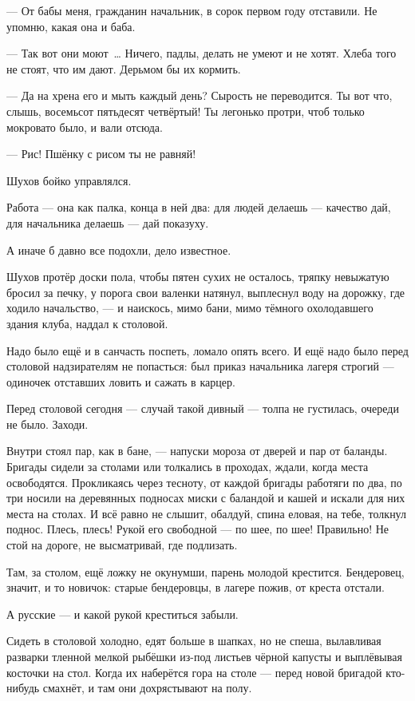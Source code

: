 --- От бабы меня, гражданин начальник, в сорок первом году отставили. Не упомню, какая она и баба.

--- Так вот они моют~\dots{} Ничего, падлы, делать не умеют и не хотят. Хлеба того не стоят, что им дают. Дерьмом бы их кормить.

--- Да на хрена его и мыть каждый день? Сырость не переводится. Ты вот что, слышь, восемьсот пятьдесят четвёртый! Ты легонько протри, чтоб только мокровато было, и вали отсюда.

--- Рис! Пшёнку с рисом ты не равняй!

Шухов бойко управлялся.

Работа --- она как палка, конца в ней два: для людей делаешь --- качество дай, для начальника делаешь --- дай показуху.

А иначе б давно все подохли, дело известное.

Шухов протёр доски пола, чтобы пятен сухих не осталось, тряпку невыжатую бросил за печку, у порога свои валенки натянул, выплеснул воду на дорожку, где ходило начальство, --- и наискось, мимо бани, мимо тёмного охолодавшего здания клуба, наддал к столовой.

Надо было ещё и в санчасть поспеть, ломало опять всего. И ещё надо было перед столовой надзирателям не попасться: был приказ начальника лагеря строгий --- одиночек отставших ловить и сажать в карцер.

Перед столовой сегодня --- случай такой дивный --- толпа не густилась, очереди не было. Заходи.

Внутри стоял пар, как в бане, --- напуски мороза от дверей и пар от баланды. Бригады сидели за столами или толкались в проходах, ждали, когда места освободятся. Прокликаясь через тесноту, от каждой бригады работяги по два, по три носили на деревянных подносах миски с баландой и кашей и искали для них места на столах. И всё равно не слышит, обалдуй, спина еловая, на тебе, толкнул поднос. Плесь, плесь! Рукой его свободной --- по шее, по шее! Правильно! Не стой на дороге, не высматривай, где подлизать.

Там, за столом, ещё ложку не окунумши, парень молодой крестится. Бендеровец, значит, и то новичок: старые бендеровцы, в лагере пожив, от креста отстали.

А русские --- и какой рукой креститься забыли.

Сидеть в столовой холодно, едят больше в шапках, но не спеша, вылавливая разварки тленной мелкой рыбёшки из-под листьев чёрной капусты и выплёвывая косточки на стол. Когда их наберётся гора на столе --- перед новой бригадой кто-нибудь смахнёт, и там они дохрястывают на полу.

